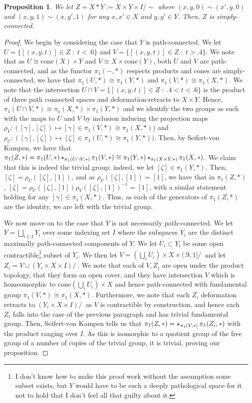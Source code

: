 \documentclass[english]{article}
\newcommand{\prob}[1]{\setcounter{section}{#1-1}\section{}}
\newtheorem*{proposition*}{Proposition}
\theoremstyle{remark}
\theoremstyle{definition}
\newcommand{\frp}{\mathop{\large {\mathlarger{\star}}}}
\begin{document}
\prob{3} \begin{proposition*}
	We let $Z=X*Y:=X\times Y\times I/\sim$ where $(x,y,0)\sim (x',y,0)$ and $(x,y,1)\sim(x,y',1)$ for any $x,x'\in X$ and $y,y'\in Y$. Then, $Z$ is simply-connected.
\end{proposition*}
\begin{proof} 
	We begin by considering the case that $Y$ is path-connected. We let $U=\{[(x,y,t)]\in Z\;:\;t<.6\}$ and $V=\{[(x,y,t)]\in Z\;:\;t>.4\}$. We note that as $U\cong \mathrm{cone}(X)\times Y$ and  $V\cong X\times \mathrm{cone}(Y)$, both $U$ and $V$ are path-connected, and as the functor $\pi_1(-,*)$ respects products and cones are simply-connected, we have that $\pi_1(U,*)\cong \pi_1(Y,*)$ and $\pi_1(V,*)\cong \pi_1(X,*)$. We note that the intersection $U\cap V=\{[(x,y,t)]\in Z\;:\;.4<t<.6\}$ is the product of three path connected spaces and deformation-retracts to $X\times Y$. Hence, $\pi_1(U\cap V,*)\cong\pi_1(X,*)\times \pi_1(Y,*)$ and we identify the two groups as such with the maps to $U$ and $V$ by inclusion inducing the projection maps $\rho_V:([\gamma],[\zeta])\mapsto [\gamma]\in \pi_1(V,*)\cong \pi_1(X,*))$ and $\rho_U:([\gamma],[\zeta])\mapsto [\zeta]\in \pi_1(U,*)\cong \pi_1(Y,*))$. Then, by Seifert-von Kampen, we have that $\pi_1(Z,*)=\pi_1(U,*)\frp_{\pi_1(U\cap V,*)} \pi_1(V,*)\cong \pi_1(Y,*)\frp_{\pi_1(X\times Y,*)}\pi_1(X,*)$. We claim that this is indeed the trivial group; indeed, we let $[\zeta]\in \pi_1(Y,*)$. Then, $[\zeta]=\rho_U([\zeta],[1])$, and as $\rho_V([\zeta],[1])=[1]$, we have that in $\pi_1(Z,*)$, $[\zeta]=\rho_U([\zeta],[1])\rho_V([\zeta],[1])^{-1}=[1]$, with a similar statement holding for any $[\gamma]\in \pi_1(X,*)$. Thus, as each of the generators of $\pi_1(Z,*)$ are the identity, we are left with the trivial group.
	
	We now move on to the case that $Y$ is not necessarily path-connected. We let $Y=\bigsqcup_{i\in I}Y_i$ over some indexing set $I$ where the subspaces $Y_i$ are the distinct maximally path-connected components of $Y$. We let $U_i\subset Y_i$ be some open contractible\footnote{I don't know how to make this proof work without the assumption some subset exists, but $Y$ would have to be such a deeply pathological space for it not to hold that I don't feel all that guilty about it.} subset of $Y_i$. We then let $V=\left(\bigcup_{i}U_i\right)\times X\times (.9,1]/~$ and let $Z_i=V\cup\left(Y_i\times X\times I\right)/~$.  We note that each of $V,Z_i$ are open under the product topology, that they form an open cover, and they have intersection $V$ which is homeomorphic to $\mathrm{cone}\left(\bigcup_{i}U_i\right)\times X$ and hence path-connected with fundamental group $\pi_1(V,*)\cong \pi_1(X,*)$. Furthermore, we note that each $Z_i$ deformation retracts to $\left(Y_i\times X\times I\right)/~$ as $V$ is contractible by construction, and hence each $Z_i$ falls into the case of the previous paragraph and has trivial fundamental group. Then, Seifert-von Kampen tells us that $\pi_1(Z,*)=\frp_{\pi_1(V,*)}\pi_1(Z_i,*)$ with the product ranging over $I$. As this is isomorphic to a quotient group of the free group of a number of copies of the trivial group, it is trivial, proving our proposition.
\end{proof}
\end{document}
